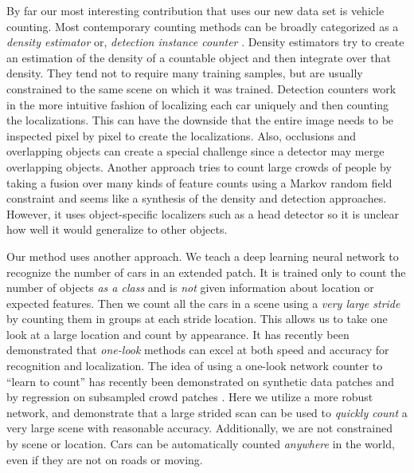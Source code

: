 \documentclass[runningheads]{llncs}
\begin{document}
By far our most interesting contribution that uses our new data set is vehicle counting. Most contemporary counting methods can be broadly categorized as a {\it density estimator} \cite{Zhang15,Arteta14,Lempitsky10} or, {\it detection instance counter} \cite{Moranduzzo14,Kamenetsky15,French15}. Density estimators try to create an estimation of the density of a countable object and then integrate over that density. They tend not to require many training samples, but are usually constrained to the same scene on which it was trained. Detection counters work in the more intuitive fashion of localizing each car uniquely and then counting the localizations. This can have the downside that the entire image needs to be inspected pixel by pixel to create the localizations. Also, occlusions and overlapping objects can create a special challenge since a detector may merge overlapping objects.  Another approach tries to count large crowds of people by taking a fusion over many kinds of feature counts using a Markov random field constraint \cite{Idrees13} and seems like a synthesis of the density and detection approaches.  However, it uses object-specific localizers such as a head detector so it is unclear how well it would generalize to other objects. 

Our method uses another approach. We teach a deep learning neural network to recognize the number of cars in an extended patch. It is trained only to count the number of objects {\it as a class} and is {\it not} given information about location or expected features. Then we count all the cars in a scene using a {\it very large stride} by counting them in groups at each stride location. This allows us to take one look at a large location and count by appearance. It has recently been demonstrated that {\it one-look} methods can excel at both speed and accuracy \cite{YOLO} for recognition and localization. The idea of using a one-look network counter to “learn to count” has recently been demonstrated on synthetic data patches \cite{Segui15} and by regression on subsampled crowd patches \cite{Wang15}. Here we utilize a more robust network, and demonstrate that a large strided scan can be used to {\it quickly count} a very large scene with reasonable accuracy. Additionally, we are not constrained by scene or location. Cars can be automatically counted {\it anywhere} in the world, even if they are not on roads or moving. 
\end{document}
